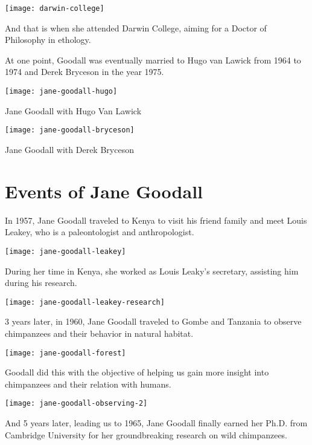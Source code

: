 \documentclass[12pt]{report}
\begin{document}
\texttt{[image: darwin-college]}

And that is when she attended Darwin College, aiming for a Doctor of Philosophy
in ethology.

\pagebreak

At one point, Goodall was eventually married to Hugo van Lawick from 1964 to
1974 and Derek Bryceson in the year 1975.

\texttt{[image: jane-goodall-hugo]}

Jane Goodall with Hugo Van Lawick

\texttt{[image: jane-goodall-bryceson]}

Jane Goodall with Derek Bryceson

\section*{Events of Jane Goodall}

In 1957, Jane Goodall traveled to Kenya to visit his friend family and meet
Louis Leakey, who is a paleontologist and anthropologist.

\texttt{[image: jane-goodall-leakey]}

During her time in Kenya, she worked as Louis Leaky’s secretary, assisting him
during his research.

\texttt{[image: jane-goodall-leakey-research]}

\pagebreak

3 years later, in 1960, Jane Goodall traveled to Gombe and Tanzania to observe
chimpanzees and their behavior in natural habitat.

\texttt{[image: jane-goodall-forest]}

Goodall did this with the objective of helping us gain more insight into
chimpanzees and their relation with humans.

\texttt{[image: jane-goodall-observing-2]}

\pagebreak

And 5 years later, leading us to 1965, Jane Goodall finally earned her Ph.D.
from Cambridge University for her groundbreaking research on wild chimpanzees.
\end{document}
